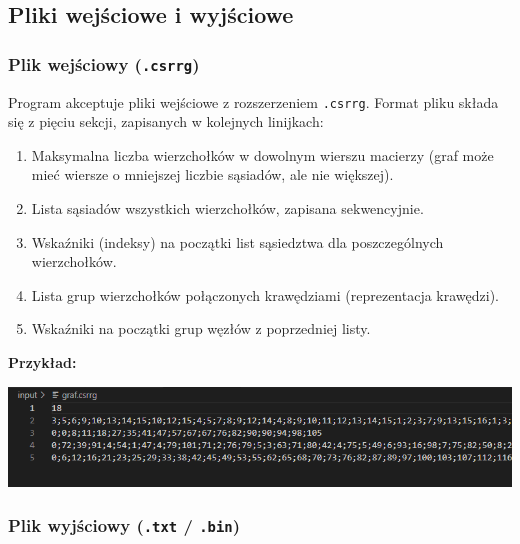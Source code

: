 \documentclass{article}
\begin{document}
    
    
    \subsection{Pliki wejściowe i wyjściowe}

        \subsubsection{Plik wejściowy (\texttt{.csrrg})}

        Program akceptuje pliki wejściowe z rozszerzeniem \texttt{.csrrg}. Format pliku składa się z pięciu sekcji, zapisanych w kolejnych linijkach:
        \begin{enumerate}
            \item Maksymalna liczba wierzchołków w dowolnym wierszu macierzy (graf może mieć wiersze o mniejszej liczbie sąsiadów, ale nie większej).
            \item Lista sąsiadów wszystkich wierzchołków, zapisana sekwencyjnie.
            \item Wskaźniki (indeksy) na początki list sąsiedztwa dla poszczególnych wierzchołków.
            \item Lista grup wierzchołków połączonych krawędziami (reprezentacja krawędzi).
            \item Wskaźniki na początki grup węzłów z poprzedniej listy.
        \end{enumerate}
        \textbf{Przykład:}
        \begin{center}
            \includegraphics[width=1\linewidth]{img/grafcsrrg.png}
        \end{center}


        \subsubsection{Plik wyjściowy (\texttt{.txt} / \texttt{.bin})}
    
\end{document}
